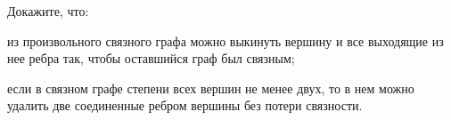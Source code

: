 Докажите, что:
\begin{enumcyr}
    \item из произвольного связного графа можно выкинуть вершину и все выходящие из нее ребра так, чтобы оставшийся граф был
	    связным;
    \item если в связном графе степени всех вершин не менее двух, то в нем можно удалить две соединенные ребром вершины без
	    потери связности.
\end{enumcyr}